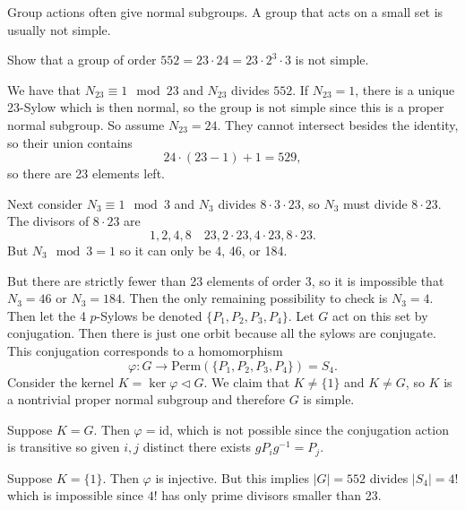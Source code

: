\documentclass{article}
\begin{document}
Group actions often give normal subgroups. A group that acts on a
small set is usually not simple.

\begin{xmpl}
  Show that a group of order
  $552 = 23 \cdot 24 = 23 \cdot 2^3 \cdot 3$ is not simple.
\end{xmpl}
We have that $N_{23} \equiv 1 \mod 23$ and $N_{23}$ divides $552$.
If $N_{23} = 1$, there is a unique 23-Sylow which is then normal,
so the group is not simple since this is a proper normal subgroup.
So assume $N_{23} = 24$. They cannot intersect besides the identity,
so their union contains
$$
24 \cdot (23 - 1) + 1 = 529,
$$
so there are 23 elements left.

Next consider $N_3 \equiv 1 \mod 3$ and $N_3$ divides
$8 \cdot 3 \cdot 23$, so $N_3$ must divide $8 \cdot 23$. The divisors
of $8 \cdot 23$ are
$$
1, 2, 4, 8 \quad 23, 2 \cdot 23, 4 \cdot 23, 8 \cdot 23.
$$
But $N_3 \mod 3 = 1$ so it can only be 4, 46, or 184.

But there are strictly fewer than 23 elements of order 3, so it is impossible
that $N_3 = 46$ or $N_3 = 184$. Then the only remaining possibility to
check is $N_3 = 4$. Then let the 4 $p$-Sylows be denoted
$\{ P_1, P_2, P_3, P_4 \}$. Let $G$ act on this set by
conjugation. Then there is just one orbit because all the sylows are
conjugate. This conjugation corresponds to a homomorphism
$$
\varphi : G \to \mathrm{Perm}(\{P_1, P_2, P_3, P_4\}) = S_4.
$$
Consider the kernel $K = \ker \varphi \triangleleft G$.
We claim that $K \neq \{ 1 \}$ and $K \neq G$, so $K$ is a
nontrivial proper normal subgroup and therefore $G$ is simple.

Suppose $K = G$. Then $\varphi = \mathrm{id}$, which is not possible
since the conjugation action is transitive so given $i, j$ distinct
there exists $g P_i g^{-1} = P_j$.

Suppose $K = \{ 1 \}$. Then $\varphi$ is injective. But this implies
$|G| = 552$ divides $|S_4| = 4!$ which is impossible since $4!$ has
only prime divisors smaller than 23.
\end{document}
